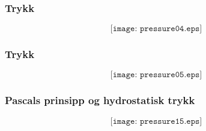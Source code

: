 \documentclass[aspectratio=169,xcolor=dvipsnames]{beamer}
\begin{document}
%
%
\begin{frame}
	\frametitle{Trykk}

	$$\texttt{[image: pressure04.eps]}$$
\end{frame}
%
%
%
\begin{frame}
	\frametitle{Trykk}

	$$\texttt{[image: pressure05.eps]}$$
\end{frame}
%
%
%
%
%
%
%
%
%
%
%
%
%
%
\begin{frame}
	\frametitle{Pascals prinsipp og hydrostatisk trykk}

	$$\texttt{[image: pressure15.eps]}$$
\end{frame}
\end{document}

